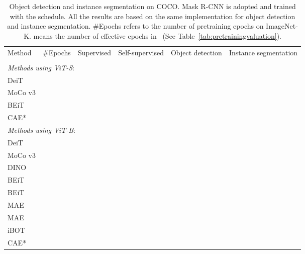 \documentclass[twocolumn]{svjour3}          \smartqed  \usepackage{graphicx}
\newcommand{\cmark}{}
\newcommand{\xmarkg}{}
\def \ours {CAE*\xspace}
\begin{document}
\begin{table*}[t]
    \centering
    \caption{Object detection and instance segmentation on COCO. 
    Mask R-CNN is adopted
    and trained with the  schedule.
    All the results are based on
    the same implementation
    for object detection and instance segmentation.
    \#Epochs refers to the number of pretraining epochs on ImageNet-K.
     means the number of effective epochs in~\cite{zhou2021ibot} (See Table~\ref{tab:pretrainingvaluation}).
    }
\setlength{\tabcolsep}{9.8pt}
\renewcommand{\arraystretch}{1}
    \small
\begin{tabular}{l c c c  c c c   c  c c}
        \toprule
        \multirow{2}{*}{Method} & 
        \multirow{2}{*}{\#Epochs} & 
        \multirow{2}{*}{Supervised} & 
        \multirow{2}{*}{Self-supervised} &
        \multicolumn{3}{c}{Object detection}& 
        \multicolumn{3}{c}{Instance segmentation}\\ 
        \cline{5-10}
          &  &  &   &{ } & {} & {} & 
        {} & 
        {} & 
        {}\\ 
        \midrule
      \multicolumn{9}{l}{\emph{Methods using ViT-S}:}\\
        DeiT  &  &\cmark & \xmarkg  &  &  &  &  &  &  \\
        MoCo v3  &  & \xmarkg & \cmark &   &  &  &  &  &  \\
        BEiT &  &\xmarkg & \cmark &  &  &  &  &  &  \\
        \ours  &  &    \xmarkg & \cmark &   &  &  &  &  &  \\
        \midrule
      \multicolumn{9}{l}{\emph{Methods using ViT-B}:}\\
        DeiT  &  &\cmark & \xmarkg  &  &  &  &  &  &  \\
        MoCo v3 &  & \xmarkg & \cmark &  &  &  &  &  &  \\
        DINO &   & \xmarkg & \cmark &   &  &  &  &  &  \\
        BEiT &   &\xmarkg & \cmark &  &  &  &  &  &  \\
        BEiT &    &\xmarkg & \cmark &  &  &  &  &  &  \\
        MAE &     & \xmarkg & \cmark &   &  &  &  &  &  \\
        MAE &     & \xmarkg & \cmark &   &  &  &  &  &  \\
        iBOT &     & \xmarkg & \cmark &   &  &  &  &  &  \\
        \ours &   & \xmarkg & \cmark &   &  &  &  &  &  \\

\end{tabular}
\end{table*}
\end{document}
